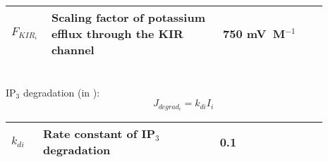 \documentclass[fleqn]{report}
\numberwithin{equation}{section}
\numberwithin{equation}{section}
\begin{document}
	\begin{table}[h!]
	\centering
	\begin{tabular}{ p{0.09\linewidth}  >{\footnotesize} p{0.5\linewidth}  >{\footnotesize} p{0.27\linewidth} >{\footnotesize} p{0.03\linewidth} }
	\hline
	$ F_{KIR_{i}} $ & Scaling factor of potassium efflux through the KIR channel & 750 mV~\textmu M$^{-1}$ &   \\
	\hline
	\end{tabular}
	\label{tab:JCli}
	\end{table}
	\\
	IP$_{3}$ degradation (in \uMs): 
	\begin{equation} \label{eq:Jdegradi}
	J_{degrad_{i}}= k_{di}I_{i}
	\end{equation}
	\begin{table}[h!]
	\centering
	\begin{tabular}{ p{0.09\linewidth}  >{\footnotesize} p{0.5\linewidth}  >{\footnotesize} p{0.27\linewidth} >{\footnotesize} p{0.03\linewidth} }
	\hline
	$k_{di}$      			& Rate constant of IP$_{3}$ degradation	& 0.1 \pers	&\cite{Koenigsberger2006} \\
	\hline
	\end{tabular}
	\label{tab:Jdegradi}
	\end{table}
\end{document}
